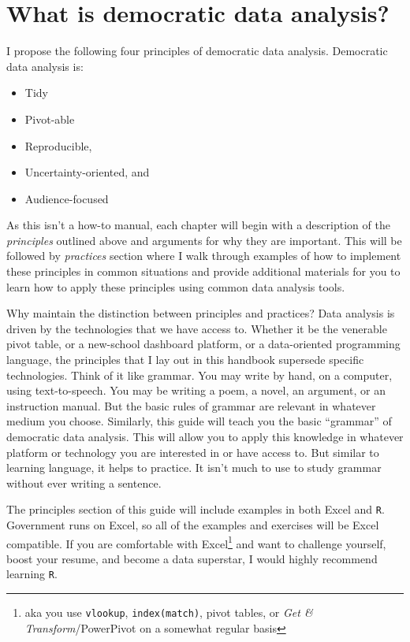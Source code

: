 \documentclass[]{book}
\providecommand{\tightlist}{%
  \setlength{\itemsep}{0pt}\setlength{\parskip}{0pt}}
\begin{document}
\hypertarget{what-is-democratic-data-analysis}{%
\section{What is democratic data analysis?}\label{what-is-democratic-data-analysis}}

I propose the following four principles of democratic data analysis. Democratic data analysis is:

\begin{itemize}
\tightlist
\item
  Tidy
\item
  Pivot-able
\item
  Reproducible,
\item
  Uncertainty-oriented, and
\item
  Audience-focused
\end{itemize}

As this isn't a how-to manual, each chapter will begin with a description of the \emph{principles} outlined above and arguments for why they are important. This will be followed by \emph{practices} section where I walk through examples of how to implement these principles in common situations and provide additional materials for you to learn how to apply these principles using common data analysis tools.

Why maintain the distinction between principles and practices? Data analysis is driven by the technologies that we have access to. Whether it be the venerable pivot table, or a new-school dashboard platform, or a data-oriented programming language, the principles that I lay out in this handbook supersede specific technologies. Think of it like grammar. You may write by hand, on a computer, using text-to-speech. You may be writing a poem, a novel, an argument, or an instruction manual. But the basic rules of grammar are relevant in whatever medium you choose. Similarly, this guide will teach you the basic ``grammar'' of democratic data analysis. This will allow you to apply this knowledge in whatever platform or technology you are interested in or have access to. But similar to learning language, it helps to practice. It isn't much to use to study grammar without ever writing a sentence.

The principles section of this guide will include examples in both Excel and \texttt{R}. Government runs on Excel, so all of the examples and exercises will be Excel compatible. If you are comfortable with Excel\footnote{aka you use \texttt{vlookup}, \texttt{index(match)}, pivot tables, or \emph{Get \& Transform}/PowerPivot on a somewhat regular basis} and want to challenge yourself, boost your resume, and become a data superstar, I would highly recommend learning \texttt{R}.
\end{document}
